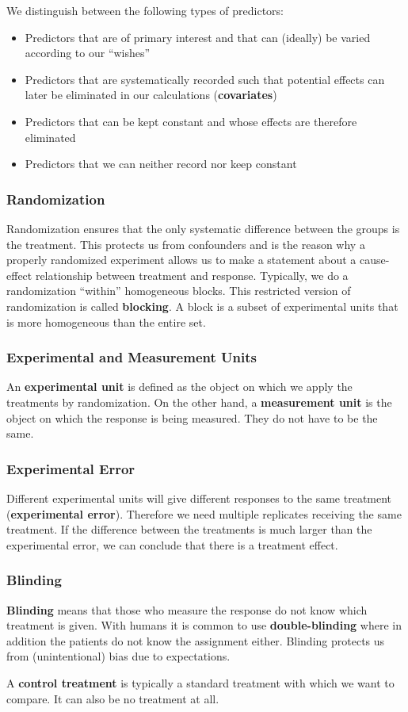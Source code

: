 We distinguish between the following types of predictors:

\begin{itemize}
	\item Predictors that are of primary interest and that can (ideally) be varied according to our “wishes”
	\item Predictors that are systematically recorded such that potential effects can later be eliminated in our calculations (\textbf{covariates})
	\item Predictors that can be kept constant and whose effects are therefore eliminated
	\item Predictors that we can neither record nor keep constant
\end{itemize}

\subsubsection{Randomization}

Randomization ensures that the only systematic difference between the groups is the treatment. This protects us from confounders and is the reason why a properly randomized experiment allows us to make a statement about a cause-effect relationship between treatment and response. Typically, we do a randomization “within” homogeneous blocks. This restricted version of randomization is called \textbf{blocking}. A block is a subset of experimental units that is more homogeneous than the entire set.

\subsubsection{Experimental and Measurement Units}

An \textbf{experimental unit} is defined as the object on which we apply the treatments by randomization. On the other hand, a \textbf{measurement unit} is the object on which the response is being measured. They do not have to be the same.

\subsubsection{Experimental Error}

Different experimental units will give different responses to the same treatment (\textbf{experimental error}). Therefore we need multiple replicates receiving the same treatment. If the difference between the treatments is much larger than the experimental error, we can conclude that there is a treatment effect.

\subsubsection{Blinding}

\textbf{Blinding} means that those who measure the response do not know which treatment is given. With humans it is common to use \textbf{double-blinding} where in addition the patients do not know the assignment either. Blinding protects us from (unintentional) bias due to expectations.

A \textbf{control treatment} is typically a standard treatment with which we want to compare. It can also be no treatment at all.